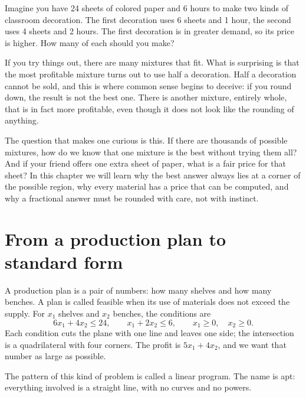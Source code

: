 \begin{untukanak}
Imagine you have 24 sheets of colored paper and 6 hours to make two kinds of classroom
decoration. The first decoration uses 6 sheets and 1 hour, the second uses 4 sheets and 2
hours. The first decoration is in greater demand, so its price is higher. How many of each
should you make?

If you try things out, there are many mixtures that fit. What is surprising is that the most
profitable mixture turns out to use half a decoration. Half a decoration cannot be sold, and
this is where common sense begins to deceive: if you round down, the result is not the best
one. There is another mixture, entirely whole, that is in fact more profitable, even though it
does not look like the rounding of anything.

The question that makes one curious is this. If there are thousands of possible mixtures, how
do we know that one mixture is the best without trying them all? And if your friend offers one
extra sheet of paper, what is a fair price for that sheet? In this chapter we will learn why
the best answer always lies at a corner of the possible region, why every material has a price
that can be computed, and why a fractional answer must be rounded with care, not with instinct.
\end{untukanak}

\section{From a production plan to standard form}

A production plan is a pair of numbers: how many shelves and how many benches. A plan is called
feasible when its use of materials does not exceed the supply. For $x_{1}$ shelves and
$x_{2}$ benches, the conditions are
\[
  6x_{1}+4x_{2}\le24,\qquad x_{1}+2x_{2}\le6,\qquad x_{1}\ge0,\quad x_{2}\ge0 .
\]
Each condition cuts the plane with one line and leaves one side; the intersection is a
quadrilateral with four corners. The profit is $5x_{1}+4x_{2}$, and we want that number as
large as possible.

The pattern of this kind of problem is called a linear program. The name is apt: everything
involved is a straight line, with no curves and no powers.


